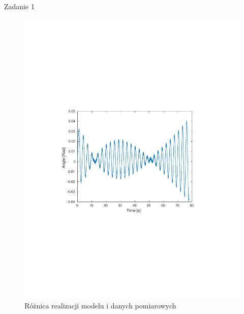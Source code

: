 \documentclass[12pt]{article}
\begin{document}
\begin{section}{Zadanie 1}
    \begin{figure}[!htb]
      \begin{center}
        \includegraphics[width=14cm,trim=3cm 8.5cm 3cm 9cm,clip]
        {../res/img/err11.pdf}
      \end{center}
      \caption{Różnica realizacji modelu i danych pomiarowych}
      \label{plot:err11}
    \end{figure}
    
  \end{section}
    
  \newpage
\end{document}

